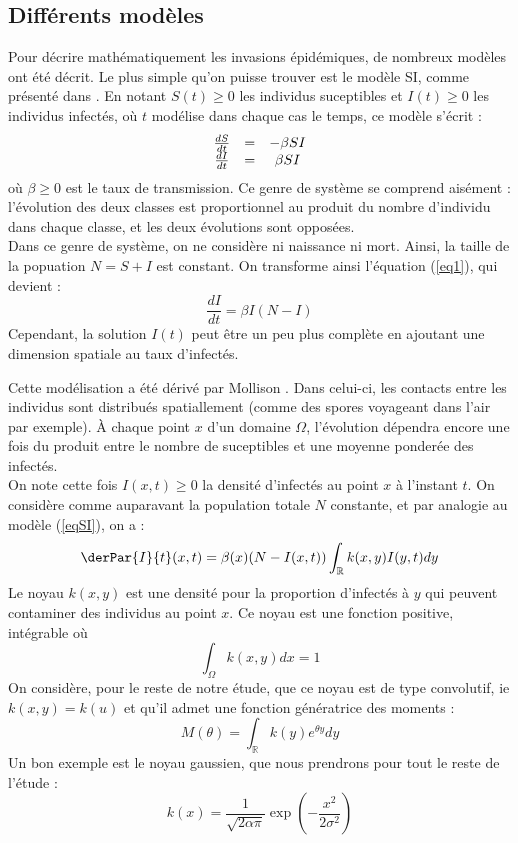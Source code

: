 \documentclass{article}
\begin{document}
\subsection{Différents modèles}
Pour décrire mathématiquement les invasions épidémiques, de nombreux modèles ont été décrit. Le plus simple qu'on puisse trouver est le modèle SI, comme présenté dans \cite{daley2001epidemic}. En notant $S(t)\geq 0$ les individus suceptibles et $I(t)\geq 0$ les individus infectés, où $t$ modélise dans chaque cas le temps, ce modèle s'écrit :
\begin{equation} \label{eq1}
\begin{array}{c c c}
	\frac{dS}{dt}&=&-\beta SI\\
	\frac{dI}{dt}&=&\beta SI
\end{array}
\end{equation}
où $\beta\geq 0$ est le taux de transmission. Ce genre de système se comprend aisément : l'évolution des deux classes est proportionnel au produit du nombre d'individu dans chaque classe, et les deux évolutions sont opposées.\\
Dans ce genre de système, on ne considère ni naissance ni mort. Ainsi, la taille de la popuation $N=S+I$ est constant. On transforme ainsi l'équation (\ref{eq1}), qui devient :
\begin{equation}\label{eqSI}
	\frac{dI}{dt}=\beta I(N-I)
\end{equation}
Cependant, la solution $I(t)$ peut être un peu plus complète en ajoutant une dimension spatiale au taux d'infectés.

\bigskip
Cette modélisation a été dérivé par Mollison \cite{mollison1972}. Dans celui-ci, les contacts entre les individus sont distribués spatiallement (comme des spores voyageant dans l'air par exemple). À chaque point $x$ d'un domaine $\Omega$, l'évolution dépendra encore une fois du produit entre le nombre de suceptibles et une moyenne ponderée des infectés.\\
On note cette fois $I(x,t)\geq 0$ la densité d'infectés au point $x$ à l'instant $t$. On considère comme auparavant la population totale $N$ constante, et par analogie au modèle (\ref{eqSI}), on a :
\begin{equation} \label{eqKot}
	\derPar{I}{t}(x,t)=\beta(x)(N-I(x,t))\int_{\mathbb{R}}k(x,y)I(y,t) dy
\end{equation}
Le noyau $k(x,y)$ est une densité pour la proportion d'infectés à $y$ qui peuvent contaminer des individus au point $x$. Ce noyau est une fonction positive, intégrable où \[\int_\Omega k(x,y) dx=1\]
On considère, pour le reste de notre étude, que ce noyau est de type convolutif, ie $k(x,y)=k(u)$ et qu'il admet une fonction génératrice des moments :
	\[M(\theta)=\int_{\mathbb{R}} k(y)e^{\theta y} dy\]
Un bon exemple est le noyau gaussien, que nous prendrons pour tout le reste de l'étude :
\begin{equation}\label{noyGau}
	k(x)=\frac{1}{\sqrt{2\alpha\pi}} \exp\left(-\frac{x^2}{2\sigma^2} \right)
\end{equation}
\end{document}
